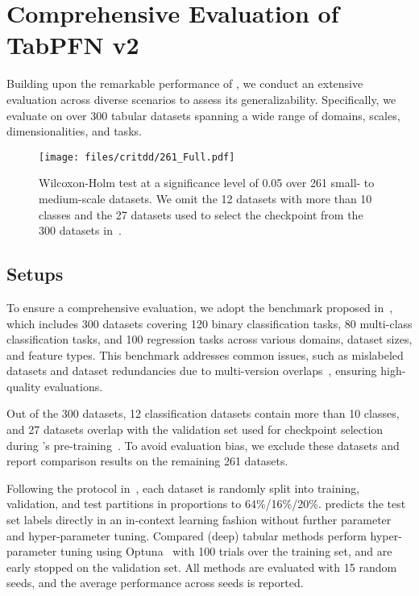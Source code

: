 \section{Comprehensive Evaluation of TabPFN v2}
Building upon the remarkable performance of \ours, we conduct an extensive evaluation across diverse scenarios to assess its generalizability. Specifically, we evaluate \ours on over 300 tabular datasets spanning a wide range of domains, scales, dimensionalities, and tasks.
\begin{figure}[t]
    \centering
                \vspace{-2mm}
    \texttt{[image: files/critdd/261\_Full.pdf]}
            \vspace{-5mm}
    \caption{Wilcoxon-Holm test at a significance level of 0.05 over 261 small- to medium-scale datasets.
    We omit the 12 datasets with more than 10 classes and the 27 datasets used to select the \ours checkpoint from the 300 datasets in~\cite{Ye2024Closer}.
    }
    \vspace{-6mm}
    \label{fig:critical_difference}
\end{figure}
\subsection{Setups}
To ensure a comprehensive evaluation, we adopt the benchmark proposed in~\citet{Ye2024Closer}, which includes 300 datasets covering 120 binary classification tasks, 80 multi-class classification tasks, and 100 regression tasks across various domains, dataset sizes, and feature types. This benchmark addresses common issues, such as mislabeled datasets and dataset redundancies due to multi-version overlaps~\cite{kohli2024towards}, ensuring high-quality evaluations.

Out of the 300 datasets, 12 classification datasets contain more than 10 classes, and 27 datasets overlap with the validation set used for checkpoint selection during \ours's pre-training~\cite{hollmann2025TabPFNv2}. To avoid evaluation bias, we exclude these datasets and report comparison results on the remaining 261 datasets.

Following the protocol in~\citet{GorishniyRKB21Revisiting,gorishniy2023tabr}, each dataset is randomly split into training, validation, and test partitions in proportions to 64\%/16\%/20\%. %
\ours predicts the test set labels directly in an in-context learning fashion without further parameter and hyper-parameter tuning.
Compared (deep) tabular methods perform hyper-parameter tuning using Optuna~\citep{akiba2019optuna} with 100 trials over the training set, and are early stopped on the validation set. All methods are evaluated with 15 random seeds, and the average performance across seeds is reported.

